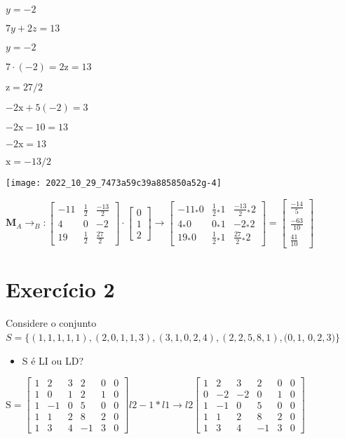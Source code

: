 \documentclass[10pt]{article}
\begin{document}
$y=-2$

$7 y+2 z=13$

$y=-2$

$7 \cdot(-2)=2 \mathrm{z}=13$

$\mathrm{z}=27 / 2$

$-2 \mathrm{x}+5(-2)=3$

$-2 \mathrm{x}-10=13$

$-2 \mathrm{x}=13$

$\mathrm{x}=-13 / 2$

\texttt{[image: 2022\_10\_29\_7473a59c39a885850a52g-4]}

$\mathbf{M}_{A} \rightarrow_{B}:\left[\begin{array}{ccc}-11 & \frac{1}{2} & \frac{-13}{2} \\ 4 & 0 & -2 \\ 19 & \frac{1}{2} & \frac{27}{2}\end{array}\right] \cdot\left[\begin{array}{c}0 \\ 1 \\ 2\end{array}\right] \rightarrow\left[\begin{array}{ccc}-11_{*} 0 & \frac{1}{2}{ }_{*} 1 & \frac{-13}{2}{ }_{*} 2 \\ 4_{*} 0 & 0_{*} 1 & -2{ }_{*} 2 \\ 19_{*} 0 & \frac{1}{2}{ }_{*} 1 & \frac{27}{2}{ }_{*} 2\end{array}\right]=\left[\begin{array}{c}\frac{-14}{5} \\ \frac{-63}{10} \\ \frac{41}{10}\end{array}\right]$

\section{Exercício 2}
Considere o conjunto $S=\{(1,1,1,1,1),(2,0,1,1,3),(3,1,0,2,4),(2,2,5,8,1),(0,1$, $0,2,3)\}$

\begin{itemize}
  \item S é LI ou LD?
\end{itemize}
$\mathrm{S}=\left[\begin{array}{ccccc|c}1 & 2 & 3 & 2 & 0 & 0 \\ 1 & 0 & 1 & 2 & 1 & 0 \\ 1 & -1 & 0 & 5 & 0 & 0 \\ 1 & 1 & 2 & 8 & 2 & 0 \\ 1 & 3 & 4 & -1 & 3 & 0\end{array} \right] l2-1 * l1 \rightarrow l2 \left[\begin{array}{ccccc|c}1 & 2 & 3 & 2 & 0 & 0 \\ 0 & -2 & -2 & 0 & 1 & 0 \\ 1 & -1 & 0 & 5 & 0 & 0 \\ 1 & 1 & 2 & 8 & 2 & 0 \\ 1 & 3 & 4 & -1 & 3 & 0\end{array}\right]$
\end{document}
